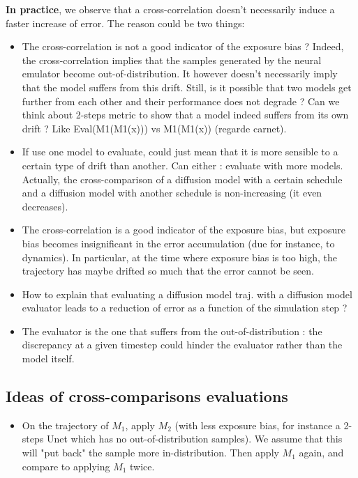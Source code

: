 \documentclass{article}
\begin{document}
\textbf{In practice}, we observe that a cross-correlation doesn't necessarily induce a faster increase of error. The reason could be two things:
\begin{itemize}
    \item The cross-correlation is not a good indicator of the exposure bias ? Indeed, the cross-correlation implies that the samples generated by the neural emulator become out-of-distribution. It however doesn't necessarily imply that the model suffers from this drift. Still, is it possible that two models get further from each other and their performance does not degrade ? Can we think about 2-steps metric to show that a model indeed suffers from its own drift ? Like Eval(M1(M1(x))) vs M1(M1(x)) (regarde carnet).
    \item If use one model to evaluate, could just mean that it is more sensible to a certain type of drift than another. Can either : evaluate with more models. Actually, the cross-comparison of a diffusion model with a certain schedule and a diffusion model with another schedule is non-increasing (it even decreases). 
    \item The cross-correlation is a good indicator of the exposure bias, but exposure bias becomes insignificant in the error accumulation (due for instance, to dynamics). In particular, at the time where exposure bias is too high, the trajectory has maybe drifted so much that the error cannot be seen.
    \item How to explain that evaluating a diffusion model traj. with a diffusion model evaluator leads to a reduction of error as a function of the simulation step ? 
    \item The evaluator is the one that suffers from the out-of-distribution : the discrepancy at a given timestep could hinder the evaluator rather than the model itself.
\end{itemize}

\subsection{Ideas of cross-comparisons evaluations}

\begin{itemize}
    \item On the trajectory of $M_1$, apply $M_2$ (with less exposure bias, for instance a 2-steps Unet which has no out-of-distribution samples). We assume that this will "put back" the sample more in-distribution. Then apply $M_1$ again, and compare to applying $M_1$ twice. 
\end{itemize}
\end{document}
